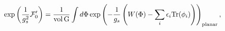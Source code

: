 \begin{equation}
\exp \left( \frac{1}{g_{s}^{2}}{\cal F}_{0}^{\prime }\right) =\frac{1}{{\rm {
vol\,}G}}\int d\Phi \exp \left( -\frac{1}{g_{s}}\left( W(\Phi
)-\sum_{i}\epsilon_{i}{\rm Tr}(\phi _{i})\right) \right) _{{\rm {planar}}},
\end{equation}

